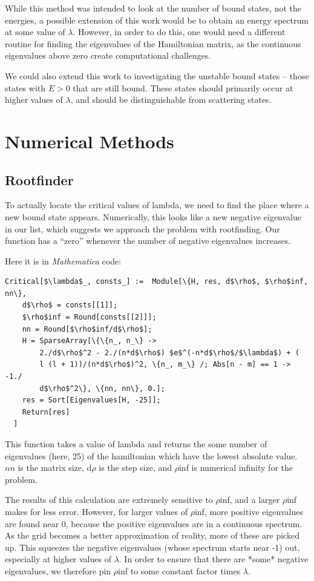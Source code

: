 \documentclass[12pt,twoside]{reedthesis}
\begin{document}
While this method was intended to look at the number of bound states, not the energies, a possible extension of this work would be to obtain an energy spectrum at some value of $\lambda$. However, in order to do this, one would need a different routine for finding the eigenvalues of the Hamiltonian matrix, as the continuous eigenvalues above zero create computational challenges.

We could also extend this work to investigating the unstable bound states -- those states with $E > 0$ that are still bound. These states should primarily occur at higher values of $\lambda$, and should be distinguishable from scattering states. 


%
\appendix
\chapter{Numerical Methods}

\section{Rootfinder}

To actually locate the critical values of lambda, we need to find the place where a new bound state appears. Numerically, this looks like a new negative eigenvalue in our list, which suggests we approach the problem with rootfinding. Our function has a ``zero'' whenever the number of negative eigenvalues increases.

Here it is in \emph{Mathematica} code:
\begin{Verbatim}[commandchars=\\\{\}, codes={\catcode`$=3}]
Critical[$\lambda$_, consts_] :=  Module[\{H, res, d$\rho$, $\rho$inf, nn\},
    d$\rho$ = consts[[1]];
    $\rho$inf = Round[consts[[2]]];
    nn = Round[$\rho$inf/d$\rho$];
    H = SparseArray[\{\{n_, n_\} -> 
        2./d$\rho$^2 - 2./(n*d$\rho$) $e$^(-n*d$\rho$/$\lambda$) + (
        l (l + 1))/(n*d$\rho$)^2, \{n_, m_\} /; Abs[n - m] == 1 -> -1./
        d$\rho$^2\}, \{nn, nn\}, 0.];
    res = Sort[Eigenvalues[H, -25]];
    Return[res]
  ]
\end{Verbatim}
This function takes a value of lambda and returns the some number of eigenvalues (here, 25)  of the hamiltonian which have the lowest absolute value. $nn$ is the matrix size, d$\rho$ is the step size, and $\rho$inf is numerical infinity for the problem.

The results of this calculation are extremely sensitive to $\rho$inf, and a larger $\rho$inf makes for less error. However, for larger values of $\rho$inf, more positive eigenvalues are found near 0, because the positive eigenvalues are in a continuous spectrum. As the grid becomes a better approximation of reality, more of these are picked up. This squeezes the negative eigenvalues (whose spectrum starts near -1) out, especially at higher values of $\lambda$. In order to ensure that there are *some* negative eigenvalues, we therefore pin $\rho$inf to some constant factor times $\lambda$. 
\end{document}
